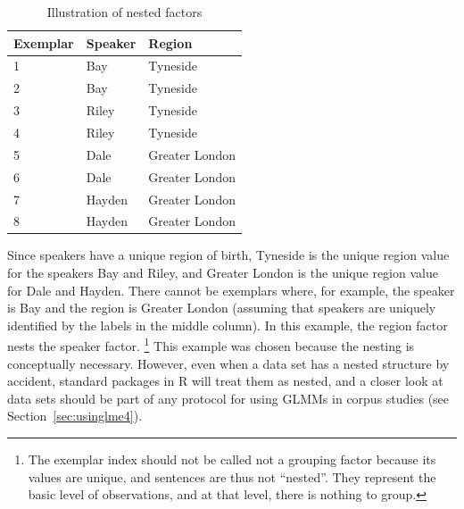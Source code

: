 \documentclass[a4paper,12pt]{article}
\begin{document}
\begin{table}
  \centering
  \begin{tabular}{lll}
    \toprule
    \textbf{Exemplar} & \textbf{Speaker}  & \textbf{Region}        \\
    \midrule
                    1 &           Bay    &         Tyneside       \\
                    2 &           Bay    &         Tyneside       \\
                    3 &           Riley  &         Tyneside       \\
                    4 &           Riley  &         Tyneside       \\
                    5 &           Dale   &         Greater London \\
                    6 &           Dale   &         Greater London \\
                    7 &           Hayden &         Greater London \\
                    8 &           Hayden &         Greater London \\
    \bottomrule
  \end{tabular}
  \caption{Illustration of nested factors}
  \label{tab:nested}
\end{table}

Since speakers have a unique region of birth, Tyneside is the unique region value for the speakers Bay and Riley, and Greater London is the unique region value for Dale and Hayden.
There cannot be exemplars where, for example, the speaker is Bay and the region is Greater London (assuming that speakers are uniquely identified by the labels in the middle column).
In this example, the region factor nests the speaker factor.%
\footnote{The exemplar index should not be called not a grouping factor because its values are unique, and sentences are thus not ``nested''.
They represent the basic level of observations, and at that level, there is nothing to group.}
This example was chosen because the nesting is conceptually necessary.
However, even when a data set has a nested structure by accident, standard packages in R will treat them as nested, and a closer look at data sets should be part of any protocol for using GLMMs in corpus studies (see Section~\ref{sec:usinglme4}).
\end{document}
